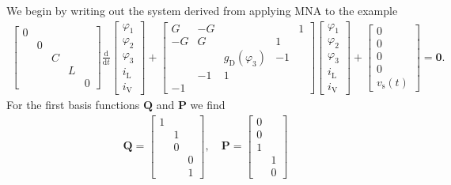 \documentclass[AMA,STIX1COL]{WileyNJD-v2}
\newcommand{\mb}[1]{\mathbf{#1}}
\newcommand{\mr}[1]{\mathrm{#1}}
\newcommand{\ddt}{\frac{\mathrm{d}}{\mathrm{d}t}}
\begin{document}
We begin by writing out the system derived from applying MNA to the example
\begin{align*}
    \begin{bmatrix}
        0 & & & &\\
        & 0 & & &\\
        & & C & &\\
        & & & L &\\
        & & & & 0
    \end{bmatrix} \ddt \begin{bmatrix}
        \varphi_1\\
        \varphi_2\\
        \varphi_3\\
        i_\mr{L}\\
        i_\mr{V}
    \end{bmatrix} + \begin{bmatrix}
        G & -G & &  & 1\\
        -G & G & & 1 &\\
        & & g_\mr{D}(\varphi_3) & -1 &\\
        & -1 & 1 & &\\
        -1 & & & &
    \end{bmatrix} \begin{bmatrix}
        \varphi_1\\
        \varphi_2\\
        \varphi_3\\
        i_\mr{L}\\
        i_\mr{V}
    \end{bmatrix} + \begin{bmatrix}
        0\\
        0\\
        0\\
        0\\
        v_\mr{s}(t)
    \end{bmatrix} = \mb{0}.
\end{align*}
For the first basis functions $\mb{Q}$ and $\mb{P}$ we find
\begin{align*}
    \mb{Q} = \begin{bmatrix}
        1 & &\\
        & 1 &\\
        & 0 &\\
        & & 0\\
        & & 1
    \end{bmatrix}, \quad \mb{P} = \begin{bmatrix}
        0 &\\
        0 &\\
        1 &\\
        & 1\\
        & 0
    \end{bmatrix}
\end{align*}
\end{document}
